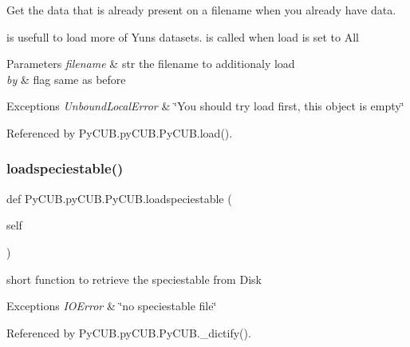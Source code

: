 Get the data that is already present on a filename when you already have data. 

is usefull to load more of Yun\textquotesingle{}s datasets. is called when load is set to All


\begin{DoxyParams}{Parameters}
{\em filename} & str the filename to additionaly load \\
\hline
{\em by} & flag same as before\\
\hline
\end{DoxyParams}

\begin{DoxyExceptions}{Exceptions}
{\em Unbound\+Local\+Error} & \char`\"{}\+You should try load first, this object is empty\char`\"{} \\
\hline
\end{DoxyExceptions}


Referenced by Py\+C\+U\+B.\+py\+C\+U\+B.\+Py\+C\+U\+B.\+load().

\mbox{\label{class_py_c_u_b_1_1py_c_u_b_1_1_py_c_u_b_ac37364050a4ec9a7ddf3d6c1562e49a5}} 
\subsubsection{\texorpdfstring{loadspeciestable()}{loadspeciestable()}}
{\footnotesize\ttfamily def Py\+C\+U\+B.\+py\+C\+U\+B.\+Py\+C\+U\+B.\+loadspeciestable (\begin{DoxyParamCaption}\item[{}]{self }\end{DoxyParamCaption})}



short function to retrieve the speciestable from Disk 


\begin{DoxyExceptions}{Exceptions}
{\em I\+O\+Error} & \char`\"{}no speciestable file\char`\"{} \\
\hline
\end{DoxyExceptions}


Referenced by Py\+C\+U\+B.\+py\+C\+U\+B.\+Py\+C\+U\+B.\+\_\+dictify().

\mbox{\label{class_py_c_u_b_1_1py_c_u_b_1_1_py_c_u_b_a2ea40ac1dd5b4ad8847ec12c867d457f}} 
